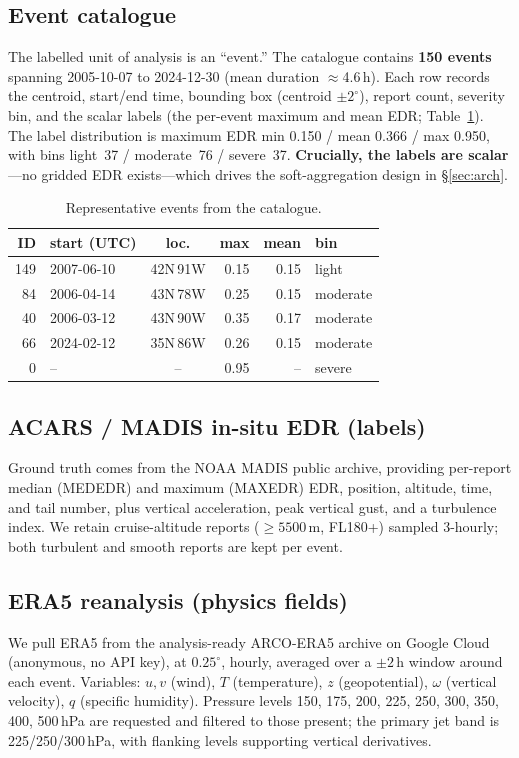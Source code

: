 \documentclass[11pt]{article}
\begin{document}
\subsection{Event catalogue}
The labelled unit of analysis is an ``event.'' The catalogue contains
\textbf{150 events} spanning 2005-10-07 to 2024-12-30 (mean duration
$\approx$4.6\,h). Each row records the centroid, start/end time,
bounding box (centroid $\pm 2^\circ$), report count, severity bin, and
the scalar labels (the per-event maximum and mean EDR;
Table~\ref{tab:events}). The label distribution is maximum EDR min
0.150 / mean 0.366 / max 0.950, with bins light~37 / moderate~76 /
severe~37. \textbf{Crucially, the labels are scalar}---no gridded EDR
exists---which drives the soft-aggregation design in
\S\ref{sec:arch}.

\begin{table}[H]
\centering\small
\caption{Representative events from the catalogue.}
\label{tab:events}
\begin{tabular}{@{}rlcrrl@{}}
\toprule
ID & start (UTC) & loc. & max & mean & bin\\
\midrule
149 & 2007-06-10 & 42N\,91W & 0.15 & 0.15 & light\\
84  & 2006-04-14 & 43N\,78W & 0.25 & 0.15 & moderate\\
40  & 2006-03-12 & 43N\,90W & 0.35 & 0.17 & moderate\\
66  & 2024-02-12 & 35N\,86W & 0.26 & 0.15 & moderate\\
0   & --         & --       & 0.95 & --   & severe\\
\bottomrule
\end{tabular}
\end{table}

\subsection{ACARS / MADIS in-situ EDR (labels)}
Ground truth comes from the NOAA MADIS public archive, providing
per-report median (MEDEDR) and maximum (MAXEDR) EDR, position,
altitude, time, and tail number, plus vertical acceleration, peak
vertical gust, and a turbulence index. We retain cruise-altitude
reports ($\geq 5500$\,m, FL180+) sampled 3-hourly; both turbulent and
smooth reports are kept per event.

\subsection{ERA5 reanalysis (physics fields)}
We pull ERA5 from the analysis-ready ARCO-ERA5 archive on Google Cloud
(anonymous, no API key), at $0.25^\circ$, hourly, averaged over a
$\pm 2$\,h window around each event. Variables: $u,v$ (wind), $T$
(temperature), $z$ (geopotential), $\omega$ (vertical velocity), $q$
(specific humidity). Pressure levels 150, 175, 200, 225, 250, 300, 350,
400, 500\,hPa are requested and filtered to those present; the primary
jet band is 225/250/300\,hPa, with flanking levels supporting vertical
derivatives.
\end{document}
